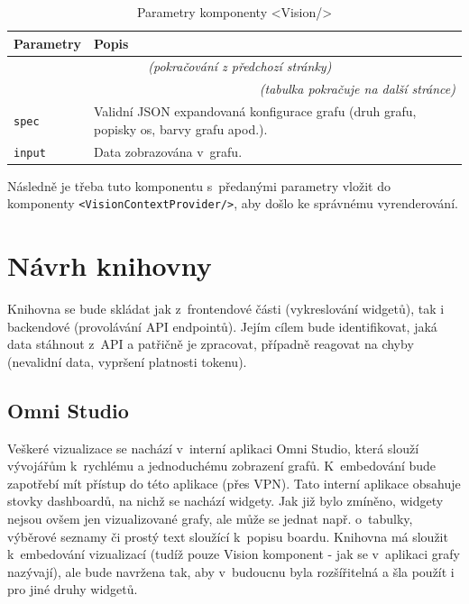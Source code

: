 \documentclass[czech, bc, kiv, he, iso690numb]{fasthesis}
\begin{document}
	\begin{longtable}{p{}p{}}
	\caption{Parametry komponenty <Vision/>}
	\label{tab:visionParams}\\
	\toprule[1.5pt]
	\textbf{Parametry} & \textbf{Popis}\\
	\midrule
	\endfirsthead
	\multicolumn{2}{c}{\tablename{}~\thetable{} \textit{(pokračování z předchozí stránky)}}\\
	\endhead
	\midrule
	\multicolumn{2}{r}{\textit{(tabulka pokračuje na další stránce)}}\\
	\endfoot
	\bottomrule[1.5pt]
	\endlastfoot
	\verb"spec" & Validní JSON expandovaná konfigurace grafu (druh grafu, popisky os, barvy grafu apod.). \\
	\midrule
	\verb"input" &  Data zobrazována v~grafu. \\
	\end{longtable}

Následně je třeba tuto komponentu s~předanými parametry vložit do komponenty \texttt{<VisionContextProvider/>}, aby došlo ke správnému vyrenderování.

\section{Návrh knihovny}

Knihovna se bude skládat jak z~frontendové části (vykreslování widgetů), tak i backendové (provolávání API endpointů). Jejím cílem bude identifikovat, jaká data stáhnout z~API a patřičně je zpracovat, případně reagovat na chyby (nevalidní data, vypršení platnosti tokenu).
\subsection{Omni Studio}
Veškeré vizualizace se nachází v~interní aplikaci Omni Studio, která slouží vývojářům k~rychlému a jednoduchému zobrazení grafů. K~embedování bude zapotřebí mít přístup do této aplikace (přes VPN). Tato interní aplikace
obsahuje stovky dashboardů, na nichž se nachází widgety. Jak již bylo zmíněno, widgety nejsou ovšem jen vizualizované grafy, ale může se jednat např. o~tabulky, výběrové seznamy či prostý text sloužící k~popisu boardu.
Knihovna má sloužit k~embedování vizualizací (tudíž pouze Vision komponent - jak se v~aplikaci grafy nazývají), ale bude navržena tak, aby v~budoucnu byla rozšířitelná a šla použít i pro jiné druhy widgetů.
\end{document}
